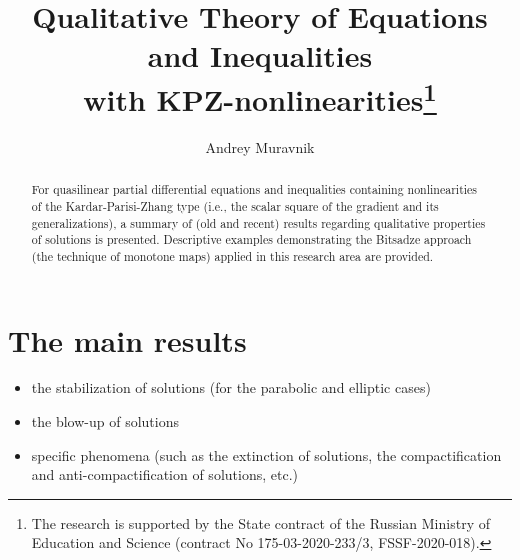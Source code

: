 \documentclass[12pt]{llncs}
\begin{document}
%
\fi

\title{Qualitative Theory of Equations and Inequalities\\
 with
  KPZ-nonlinearities\thanks{The research is supported by the State contract
   of the Russian Ministry of Education and
Science (contract No
 175-03-2020-233/3, FSSF-2020-018).}}
\author{Andrey Muravnik
}

\maketitle

\begin{abstract}
For quasilinear partial differential equations and inequalities
containing nonlinearities of the
 Kardar-Parisi-Zhang
  type (i.e., the scalar square of the gradient and its generalizations),
a summary of (old and recent) results regarding qualitative
properties of solutions is presented.
 Descriptive examples
demonstrating the Bitsadze approach (the technique of monotone
maps) applied in this research area are provided.

\end{abstract}

\section{The main results}

\begin{itemize}

\item
    the stabilization of solutions (for the parabolic and elliptic cases)


\item
    the blow-up
    of solutions

\item
 specific phenomena (such as the extinction of solutions, the compactification and anti-compactification
 of solutions, etc.)

\end{itemize}
\end{document}
